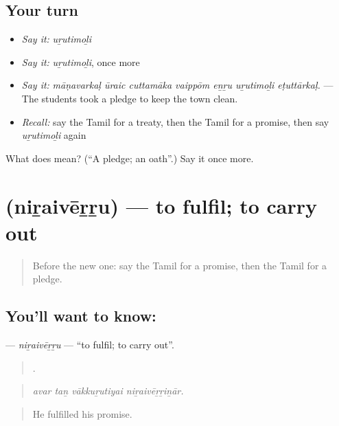 \subsection*{Your turn}
\begin{itemize}
\raggedright
  \item \emph{Say it:} \emph{uṟutimoḻi}
  \item \emph{Say it:} \emph{uṟutimoḻi}, once more
  \item \emph{Say it:} \emph{māṇavarkaḷ ūraic cuttamāka vaippōm eṉṟu uṟutimoḻi eṭuttārkaḷ.} — The students took a pledge to keep the town clean.
  \item \emph{Recall:} say the Tamil for a treaty, then the Tamil for a promise, then say \emph{uṟutimoḻi} again
\end{itemize}

\begin{tcolorbox}[breakable,colback=teal!4,colframe=teal!35!black,title={Before you move on}]
What does  mean? (\textquotedblleft{}A pledge; an oath\textquotedblright{}.) Say it once more.
\end{tcolorbox}
\section[\texorpdfstring{\ta{நிறைவேற்று} (niṟaivēṟṟu)}{நிறைவேற்று (niṟaivēṟṟu)}]{ (niṟaivēṟṟu) — to fulfil; to carry out}

\label{lesson:TA-C387-niraiverru}



\begin{quote}
Before the new one: say the Tamil for a promise, then the Tamil for a pledge.
\end{quote}

\subsection*{You'll want to know: }
\textbf{} — \emph{niṟaivēṟṟu} — \textquotedblleft{}to fulfil; to carry out\textquotedblright{}.

\begin{quote}
   .
\end{quote}

\begin{quote}
\emph{avar taṉ vākkuṟutiyai niṟaivēṟṟiṉār.}
\end{quote}

\begin{quote}
He fulfilled his promise.
\end{quote}

